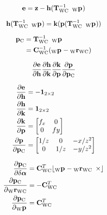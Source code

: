 \begin{equation}
  {{\mathbf{e}}}
    = {{\mathbf{z}}} - {\mathbf{h}}({{\mathbf{T}}}^{-1}_{{\text{W}}{\text{C}}} \enspace {{{{}_{{\text{W}}}} {{\mathbf{p}}}_{}}})
\end{equation}

\begin{equation}
  {\mathbf{h}}({{\mathbf{T}}}^{-1}_{{\text{W}}{\text{C}}} \enspace {{{{}_{{\text{W}}}} {{\mathbf{p}}}_{}}})
    = {\mathbf{k}}({\mathbf{p}}({{\mathbf{T}}}^{-1}_{{\text{W}}{\text{C}}} \enspace {{{{}_{{\text{W}}}} {{\mathbf{p}}}_{}}}))
\end{equation}


\begin{align}
  {\mathbf{p}}_{{\text{C}}}
    &= {{\mathbf{T}}}^{-1}_{{\text{W}}{\text{C}}} \enspace {{{{}_{{\text{W}}}} {{\mathbf{p}}}_{}}} \\
    &= {{\mathbf{C}}}^{-1}_{{\text{W}}{\text{C}}} ({{{{}_{{\text{W}}}} {{\mathbf{p}}}_{}}} - {{{{}_{{\text{W}}}} {{{\mathbf{r}}}}_{{\text{W}}{\text{C}}}}})
\end{align}

\begin{equation}
  \dfrac{\partial{{\mathbf{e}}}}{\partial{{\mathbf{h}}}}
  \dfrac{\partial{{\mathbf{h}}}}{\partial{{\mathbf{k}}}}
  \dfrac{\partial{{\mathbf{k}}}}{\partial{{\mathbf{p}}}}
  \dfrac{\partial{{\mathbf{p}}}}{\partial{{\mathbf{p}}_{{\text{C}}}}}
\end{equation}

\begin{align}
  \dfrac{\partial{{\mathbf{e}}}}{\partial{{\mathbf{h}}}} &=
    - {{\mathbf{1}}_{2\times2}} \\
  \dfrac{\partial{{\mathbf{h}}}}{\partial{{\mathbf{k}}}} &=
    {{\mathbf{1}}_{2\times2}} \\
  \dfrac{\partial{{\mathbf{k}}}}{\partial{{\mathbf{p}}}} &=
    \begin{bmatrix}
      f_x & 0 \\
      0 & fy
    \end{bmatrix} \\
  \dfrac{\partial{{\mathbf{p}}}}{\partial{{\mathbf{p}}_{{\text{C}}}}} &=
    \begin{bmatrix}
      1 / z & 0 & -x / z^2 \\
      0 & 1 / z & -y / z^2
    \end{bmatrix}
\end{align}

\begin{align}
  \dfrac{\partial{{\mathbf{p}}_{{\text{C}}}}}{\partial{{\delta\boldsymbol{\alpha}}}} &=
    {{\mathbf{C}}}^{T}_{{\text{W}}{\text{C}}} {\lfloor {{{{}_{{\text{W}}}} {{\mathbf{p}}}_{}}} - {{{{}_{{\text{W}}}} {{{\mathbf{r}}}}_{{\text{W}}{\text{C}}}}} \enspace \times \rfloor} \\
  \dfrac{\partial{{\mathbf{p}}_{{\text{C}}}}}{\partial{{{{{}_{{\text{W}}}} {{{\mathbf{r}}}}_{{\text{W}}{\text{C}}}}}}} &=
    - {{\mathbf{C}}}^{T}_{{\text{W}}{\text{C}}} \\
  \dfrac{\partial{{\mathbf{p}}_{{\text{C}}}}}{\partial{{{{{}_{{\text{W}}}} {{\mathbf{p}}}_{}}}}} &=
    {{\mathbf{C}}}^{T}_{{\text{W}}{\text{C}}}
\end{align}




